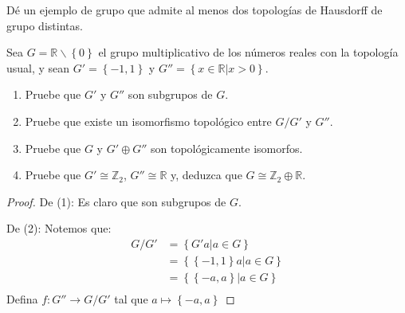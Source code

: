 \documentclass[12pt]{report}
\theoremstyle{largebreak}
\newcommand{\cf}[3]{\ensuremath{#1:#2\rightarrow#3}}
\begin{document}
    \begin{excer}
        Dé un ejemplo de grupo que admite al menos dos topologías de Hausdorff de grupo distintas. 
    \end{excer}

    \begin{sol}
        
    \end{sol}

    \begin{excer}
        Sea $G=\mathbb{R}\backslash\left\{0\right\}$ el grupo multiplicativo de los números reales con la topología usual, y sean $G'=\left\{-1,1\right\}$ y $G''=\left\{x\in \mathbb{R}\Big|x>0 \right\}$.
        \begin{enumerate}
            \item Pruebe que $G'$ y $G''$ son subgrupos de $G$.
            \item Pruebe que existe un isomorfismo topológico entre $G/G'$ y $G''$.
            \item Pruebe que $G$ y $G'\oplus G''$ son topológicamente isomorfos.
            \item Pruebe que $G'\cong \mathbb{Z}_2$, $G''\cong \mathbb{R}$ y, deduzca que $G\cong \mathbb{Z}_2\oplus \mathbb{R}$.
        \end{enumerate}
    \end{excer}

    \begin{proof}
        De (1): Es claro que son subgrupos de $G$.

        De (2): Notemos que:
        \begin{equation*}
            \begin{split}
                G/G'&=\left\{ G'a\Big|a\in G \right\}\\
                &=\left\{ \left\{-1,1\right\}a\Big|a\in G \right\}\\
                &=\left\{ \left\{-a,a\right\}\Big|a\in G \right\}\\
            \end{split}
        \end{equation*}
        Defina $\cf{f}{G''}{G/G'}$ tal que $a\mapsto \left\{-a,a\right\}$
    \end{proof}
\end{document}

